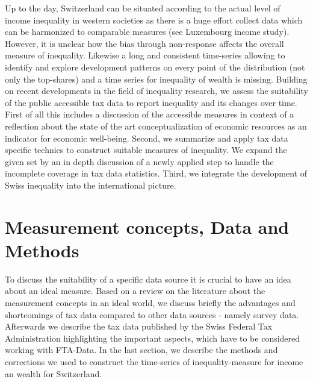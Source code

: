 \documentclass[twoside]{article}\usepackage[]{graphicx}\usepackage[]{color}
\begin{document}
\begin{multicols}{2}
Up to the day, Switzerland can be situated according to the actual level of income inequality in western societies as there is a huge effort collect data which can be harmonized to comparable measures (see Luxembourg income study). However, it is unclear how the bias through non-response affects the overall measure of inequality. Likewise a long and consistent time-series allowing to identify and explore development patterns on every point of the distribution (not only the top-shares) and a time series for inequality of wealth is missing. Building on recent developments in the field of inequality research, we assess the suitability of the public accessible tax data to report inequality and its changes over time. First of all this includes a discussion of the accessible measures in context of a reflection about the state of the art conceptualization of economic resources as an indicator for economic well-being. Second, we summarize and apply tax data specific technics to construct suitable measures of inequality. We expand the given set by an in depth discussion of a newly applied step to handle the incomplete coverage in tax data statistics. Third, we integrate the development of Swiss inequality into the international picture.











\section{Measurement concepts, Data and Methods}

To discuss the suitability of a specific data source it is crucial to have an idea about an ideal measure. Based on a review on the literature about the measurement concepts in an ideal world, we discuss briefly the advantages and shortcomings of tax data compared to other data sources - namely survey data. Afterwards we describe the tax data published by the Swiss Federal Tax Administration highlighting the important aspects, which have to be considered working with FTA-Data. In the last section, we describe the methods and corrections we used to construct the time-series of inequality-measure for income an wealth for Switzerland.


\end{multicols}
\end{document}
